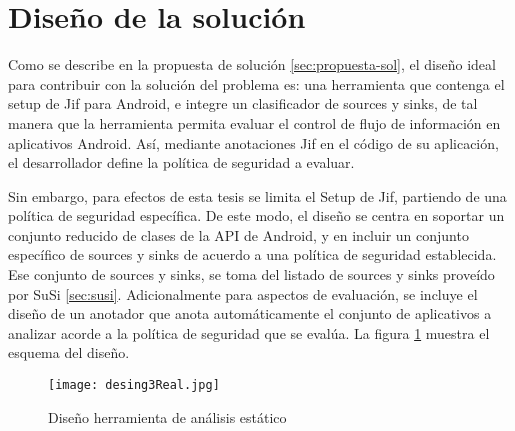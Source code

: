 
\section{Diseño de la solución}
Como se describe en la propuesta de solución \ref{sec:propuesta-sol}, el
diseño ideal para contribuir con la solución del problema es: una herramienta
que contenga el setup de Jif para Android, e integre un clasificador de
sources y sinks, de tal manera que la herramienta permita evaluar el control de
flujo de información en aplicativos Android. Así, mediante anotaciones Jif en el
código de su aplicación, el desarrollador define la política de seguridad a evaluar.

Sin embargo, para efectos de esta tesis se limita el Setup de Jif, partiendo de
una política de seguridad específica. De este modo, el diseño se centra en
soportar un conjunto reducido de clases de la API de Android, y en incluir un
conjunto específico de sources y sinks de acuerdo a una política de seguridad
establecida. Ese conjunto de sources y sinks, se toma del listado de sources y
sinks proveído por SuSi \ref{sec:susi}.\newline 
Adicionalmente para aspectos de evaluación, se incluye el diseño de un anotador
que anota automáticamente el conjunto de aplicativos a analizar acorde a la
política de seguridad que se evalúa. La figura \ref{fig:desingReal} muestra el
esquema del diseño.
\begin{figure}[t!]
	\begin{center} 
	\texttt{[image: desing3Real.jpg]} 
	\end{center}
	\caption{Diseño herramienta de análisis estático}
	\label{fig:desingReal}
\end{figure}

